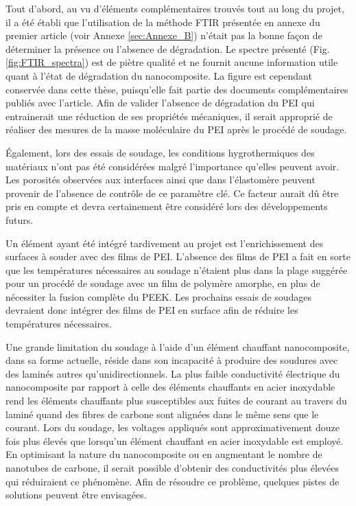 Tout d'abord, au vu d'éléments complémentaires trouvés tout au long du projet, il a été établi que l'utilisation de la méthode FTIR présentée en annexe du premier article (voir Annexe \ref{sec:Annexe_B}) n'était pas la bonne façon de déterminer la présence ou l'absence de dégradation. 
Le spectre présenté (Fig. \ref{fig:FTIR_spectra}) est de piètre qualité et ne fournit aucune information utile quant à l'état de dégradation du nanocomposite. 
La figure est cependant conservée dans cette thèse, puisqu'elle fait partie des documents complémentaires publiés avec l'article. 
Afin de valider l'absence de dégradation du PEI qui entrainerait une réduction de ses propriétés mécaniques, il serait approprié de réaliser des mesures de la masse moléculaire du PEI après le procédé de soudage. 

Également, lors des essais de soudage, les conditions hygrothermiques des matériaux n'ont pas été considérées malgré l'importance qu'elles peuvent avoir. 
Les porosités observées aux interfaces ainsi que dans l'élastomère peuvent provenir de l'absence de contrôle de ce paramètre clé. 
Ce facteur aurait dû être pris en compte et devra certainement être considéré lors des développements futurs. 

Un élément ayant été intégré tardivement au projet est l'enrichissement des surfaces à souder avec des films de PEI. 
L'absence des films de PEI a fait en sorte que les températures nécessaires au soudage n'étaient plus dans la plage suggérée pour un procédé de soudage avec un film de polymère amorphe, en plus de nécessiter la fusion complète du PEEK. 
Les prochains essais de soudages devraient donc intégrer des films de PEI en surface afin de réduire les températures nécessaires.  

Une grande limitation du soudage à l'aide d'un élément chauffant nanocomposite, dans sa forme actuelle, réside dans son incapacité à produire des soudures avec des laminés autres qu'unidirectionnels. 
La plus faible conductivité électrique du nanocomposite par rapport à celle des éléments chauffants en acier inoxydable rend les éléments chauffants plus susceptibles aux fuites de courant au travers du laminé quand des fibres de carbone sont alignées dans le même sens que le courant. 
Lors du soudage, les voltages appliqués sont approximativement douze fois plus élevés que lorsqu'un élément chauffant en acier inoxydable est employé. 
En optimisant la nature du nanocomposite ou en augmentant le nombre de nanotubes de carbone, il serait possible d'obtenir des conductivités plus élevées qui réduiraient ce phénomène. 
Afin de résoudre ce problème, quelques pistes de solutions peuvent être envisagées. 

